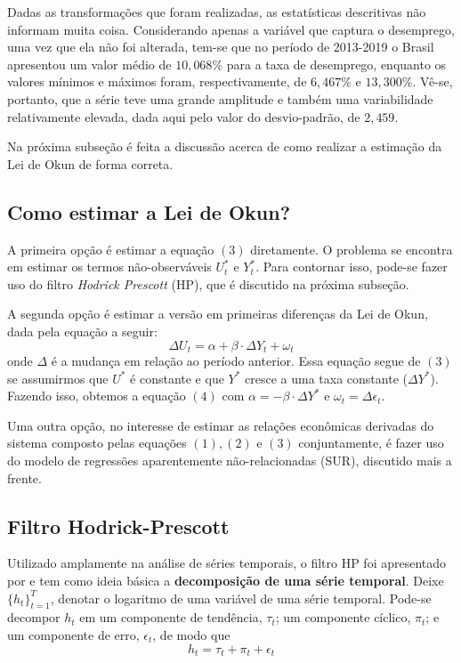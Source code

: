 \documentclass[12pt, openright,oneside, a4paper, english, brazil, section = TITLE, ubsection = Title]{article}
\begin{document}
Dadas as transformações que foram realizadas, as estatísticas descritivas não informam muita coisa. Considerando apenas a variável que captura o desemprego, uma vez que ela não foi alterada, tem-se que no período de 2013-2019 o Brasil apresentou um valor médio de $10,068\%$ para a taxa de desemprego, enquanto os valores mínimos e máximos foram, respectivamente, de $6,467\%$ e $13,300\%$. Vê-se, portanto, que a série teve uma grande amplitude e também uma variabilidade relativamente elevada, dada aqui pelo valor do desvio-padrão, de $2,459$. 

Na próxima subseção é feita a discussão acerca de como realizar a estimação da Lei de Okun de forma correta.

\subsection{Como estimar a Lei de Okun?}

A primeira opção é estimar a equação $(3)$ diretamente. O problema se encontra em estimar os termos não-observáveis $U_t^*$ e $Y_t^*$. Para contornar isso, pode-se fazer uso do filtro \textit{Hodrick Prescott} (HP), que é discutido na próxima subseção.

A segunda opção é estimar a versão em primeiras diferenças da Lei de Okun, dada pela equação a seguir:
    \begin{equation}
    \Delta U_t = \alpha + \beta \cdot \Delta Y_t + \omega_t
    \end{equation}
onde $\Delta$ é a mudança em relação ao período anterior. Essa equação segue de $(3)$ se assumirmos que $U^*$ é constante e que $Y^*$ cresce a uma taxa constante ($\Delta Y^*$). Fazendo isso, obtemos a equação $(4)$ com $\alpha = -\beta \cdot \Delta Y^*$ e $\omega_t = \Delta \epsilon_t$.

Uma outra opção, no interesse de estimar as relações econômicas derivadas do sistema composto pelas equações $(1), (2)$ e $(3)$ conjuntamente, é fazer uso do modelo de regressões aparentemente não-relacionadas (SUR), discutido mais a frente.

\subsection{Filtro Hodrick-Prescott}

Utilizado amplamente na análise de séries temporais, o filtro HP foi apresentado por  e tem como ideia básica a \textbf{decomposição de uma série temporal}. Deixe $\{h_t\}_{t=1}^{T}$, denotar o logaritmo de uma variável de uma série temporal. Pode-se decompor $h_t$ em um componente de tendência, $\tau_t$; um componente cíclico, $\pi_t$; e um componente de erro, $\epsilon_t$, de modo que 
\begin{equation}
h_t = \tau_t + \pi_t + \epsilon_t
\end{equation}
\end{document}
